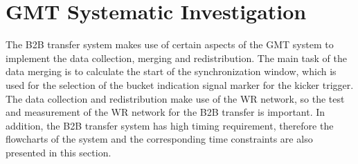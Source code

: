 \section{GMT Systematic Investigation}
\label{real_timing}
The B2B transfer system makes use of certain aspects of the GMT system to implement the data collection, merging and redistribution. The main task of the data merging is to calculate the start of the synchronization window, which is used for the selection of the bucket indication signal marker for the kicker trigger. The data collection and redistribution make use of the WR network, so the test and measurement of the WR network for the B2B transfer is important. In addition, the B2B transfer system has high timing requirement, therefore the flowcharts of the system and the corresponding time constraints are also presented in this section.

